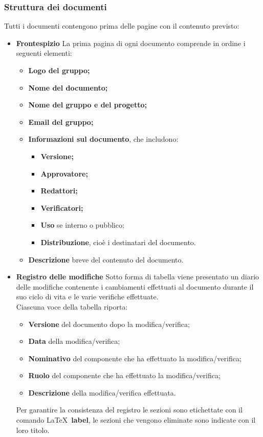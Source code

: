 \subsubsection{Struttura dei documenti}\label{StrutturaDocumenti}
Tutti i documenti contengono prima delle pagine con il contenuto previsto:
\begin{itemize}
\item \textbf{Frontespizio}
La prima pagina di ogni documento comprende in ordine i seguenti elementi:
\begin{itemize}
	\item \textbf{Logo del gruppo;}
	\item \textbf{Nome del documento;}
	\item \textbf{Nome del gruppo e del progetto;}
	\item \textbf{Email del gruppo;}
	\item \textbf{Informazioni sul documento}, che includono:
		\begin{itemize}
			\item \textbf{Versione;}
			\item \textbf{Approvatore;}
			\item \textbf{Redattori;}
			\item \textbf{Verificatori;}
			\item \textbf{Uso} se interno o pubblico;
			\item \textbf{Distribuzione}, cioè i destinatari del documento.
		\end{itemize}
	\item \textbf{Descrizione} breve del contenuto del documento.
\end{itemize}

\item\textbf{Registro delle modifiche}
Sotto forma di tabella viene presentato un diario delle modifiche contenente i cambiamenti effettuati al documento durante il suo ciclo di vita e le varie verifiche effettuate.\\
Ciascuna voce della tabella riporta:
\begin{itemize}
	\item \textbf{Versione} del documento dopo la modifica/verifica;
	\item \textbf{Data} della modifica/verifica;
	\item \textbf{Nominativo} del componente che ha effettuato la modifica/verifica;
	\item \textbf{Ruolo} del componente che ha effettuato la modifica/verifica;
	\item \textbf{Descrizione} della modifica/verifica effettuata.
\end{itemize}
Per garantire la consistenza del registro le sezioni sono etichettate con il comando \LaTeX\ \textbf{label}, le sezioni che vengono eliminate sono indicate con il loro titolo.


\end{itemize}
